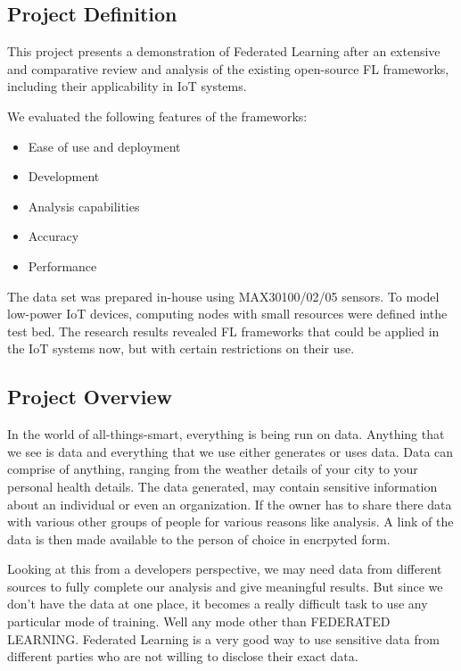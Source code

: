 \documentclass[14pt]{extarticle}
\begin{document}
\subsection{Project Definition}

\par This project presents a demonstration of Federated Learning after an extensive and comparative review and analysis of the existing open-source FL frameworks, including their applicability in IoT systems.

We evaluated the following features of the frameworks: 
\begin{itemize}
    \item Ease of use and deployment
    \item Development
    \item Analysis capabilities
    \item Accuracy
    \item Performance
\end{itemize}

The data set was prepared in-house using MAX30100/02/05 sensors. To model low-power IoT devices, computing nodes with small resources were defined inthe test bed. The research results revealed FL frameworks that could be applied in the IoT systems now, but with certain restrictions on their use.

\newpage
\subsection{Project Overview}

\par In the world of all-things-smart, everything is being run on data. Anything that we 
see is data and everything that we use either generates or uses data. Data can comprise of
anything, ranging from the weather details of your city to your personal health details.
The data generated, may contain sensitive information about an individual or even an
organization. If the owner has to share there data with various other groups of people for
various reasons like analysis. A link of the data is then made available to the person of
choice in encrpyted form.

\par Looking at this from a developers perspective, we may need data from different sources
to fully complete our analysis and give meaningful results. But since we don’t have the
data at one place, it becomes a really difficult task to use any particular mode of training.
Well any mode other than FEDERATED LEARNING. Federated Learning is a very good
way to use sensitive data from different parties who are not willing to disclose their exact
data.
\end{document}
